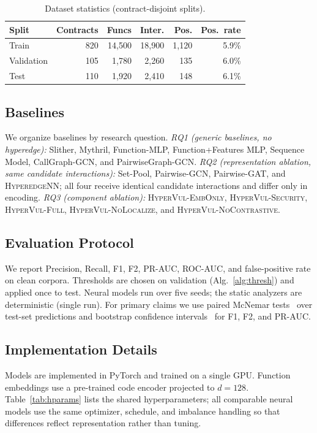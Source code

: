 \documentclass[conference]{IEEEtran}
\newcommand{\hyperedgenn}{\textsc{HyperedgeNN}}
\begin{document}
\begin{table}[t]
\caption{Dataset statistics (contract-disjoint splits).}
\label{tab:dataset}
\centering
\setlength{\tabcolsep}{3.2pt}
\begin{tabular}{lrrrrr}
\toprule
Split & Contracts & Funcs & Inter. & Pos. & Pos.\ rate \\
\midrule
Train      & 820 & 14{,}500 & 18{,}900 & 1{,}120 & 5.9\% \\
Validation & 105 & 1{,}780  & 2{,}260  & 135     & 6.0\% \\
Test       & 110 & 1{,}920  & 2{,}410  & 148     & 6.1\% \\
\bottomrule
\end{tabular}
\end{table}

\subsection{Baselines}
We organize baselines by research question.
\emph{RQ1 (generic baselines, no hyperedge):} Slither, Mythril, Function-MLP,
Function+Features MLP, Sequence Model, CallGraph-GCN, and PairwiseGraph-GCN.
\emph{RQ2 (representation ablation, same candidate interactions):} Set-Pool,
Pairwise-GCN, Pairwise-GAT, and \hyperedgenn{}; all four receive identical candidate
interactions and differ only in encoding.
\emph{RQ3 (component ablation):} \textsc{HyperVul-EmbOnly},
\textsc{HyperVul-Security}, \textsc{HyperVul-Full}, \textsc{HyperVul-NoLocalize}, and
\textsc{HyperVul-NoContrastive}.

\subsection{Evaluation Protocol}
We report Precision, Recall, F1, F2, PR-AUC, ROC-AUC, and false-positive rate on
clean corpora. Thresholds are chosen on validation (Alg.~\ref{alg:thresh}) and applied
once to test. Neural models run over five seeds; the static analyzers are
deterministic (single run). For primary claims we use paired McNemar
tests~\cite{dietterich1998} over test-set predictions and bootstrap confidence
intervals~\cite{efron1994bootstrap} for F1, F2, and PR-AUC.

\subsection{Implementation Details}
Models are implemented in PyTorch and trained on a single GPU. Function embeddings use
a pre-trained code encoder projected to $d{=}128$. Table~\ref{tab:hparams} lists the
shared hyperparameters; all comparable neural models use the same optimizer, schedule,
and imbalance handling so that differences reflect representation rather than tuning.
\end{document}
